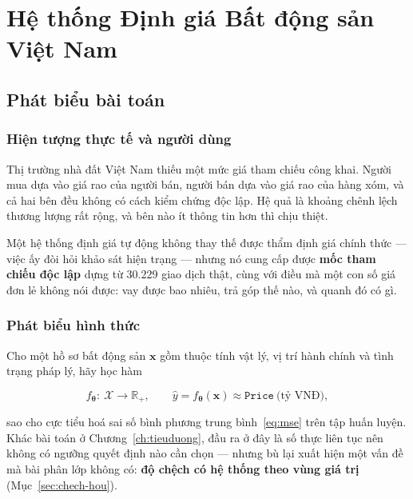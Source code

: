 \chapter{Hệ thống Định giá Bất động sản Việt Nam}
\label{ch:batdongsan}

\section{Phát biểu bài toán}
\label{sec:phatbieu-hou}

\subsection{Hiện tượng thực tế và người dùng}

Thị trường nhà đất Việt Nam thiếu một mức giá tham chiếu công khai. Người mua
dựa vào giá rao của người bán, người bán dựa vào giá rao của hàng xóm, và cả hai
bên đều không có cách kiểm chứng độc lập. Hệ quả là khoảng chênh lệch thương
lượng rất rộng, và bên nào ít thông tin hơn thì chịu thiệt.

Một hệ thống định giá tự động không thay thế được thẩm định giá chính thức ---
việc ấy đòi hỏi khảo sát hiện trạng --- nhưng nó cung cấp được \textbf{mốc tham
chiếu độc lập} dựng từ 30.229 giao dịch thật, cùng với điều mà một con số giá
đơn lẻ không nói được: vay được bao nhiêu, trả góp thế nào, và quanh đó có gì.

\subsection{Phát biểu hình thức}

Cho một hồ sơ bất động sản $\mathbf{x}$ gồm thuộc tính vật lý, vị trí hành chính
và tình trạng pháp lý, hãy học hàm

\begin{equation}
f_{\bm\theta}:\ \mathcal{X}\longrightarrow\mathbb{R}_{+},
\qquad
\hat y = f_{\bm\theta}(\mathbf{x}) \approx \texttt{Price}\ \text{(tỷ VNĐ)},
\label{eq:baitoan-hou}
\end{equation}

\noindent sao cho cực tiểu hoá sai số bình phương trung bình~\eqref{eq:mse} trên
tập huấn luyện. Khác bài toán ở Chương~\ref{ch:tieuduong}, đầu ra ở đây là số
thực liên tục nên không có ngưỡng quyết định nào cần chọn --- nhưng bù lại xuất
hiện một vấn đề mà bài phân lớp không có: \textbf{độ chệch có hệ thống theo vùng
giá trị} (Mục~\ref{sec:chech-hou}).

